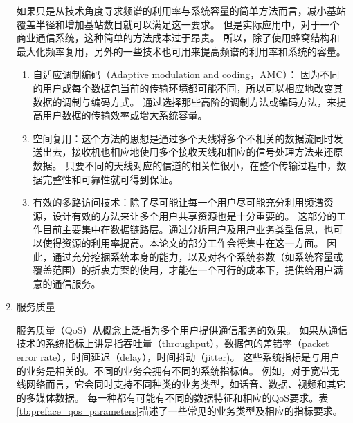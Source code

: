 \begin{enumerate}[1)]
如果只是从技术角度寻求频谱的利用率与系统容量的简单方法而言，减小基站覆盖半径和增加基站数目就可以满足这一要求。
但是实际应用中，对于一个商业通信系统，这种简单的方法成本过于昂贵。
所以，除了使用蜂窝结构和最大化频率复用，另外的一些技术也可用来提高频谱的利用率和系统的容量。
\begin{enumerate}[(1)]
\item 自适应调制编码（Adaptive modulation and coding，AMC）：
因为不同的用户或每个数据包当前的传输环境都可能不同，所以可以相应地改变其数据的调制与编码方式。
通过选择那些高阶的调制方法或编码方法，来提高用户数据的传输效率或增大系统容量。
\item 空间复用：这个方法的思想是通过多个天线将多个不相关的数据流同时发送出去，接收机也相应地使用多个接收天线和相应的信号处理方法来还原数据。
只要不同的天线对应的信道的相关性很小，在整个传输过程中，数据完整性和可靠性就可得到保证。
\item 有效的多路访问技术：除了尽可能让每一个用户尽可能充分利用频谱资源，设计有效的方法来让多个用户共享资源也是十分重要的。
这部分的工作目前主要集中在数据链路层。通过分析用户及用户业务类型信息，也可以使得资源的利用率提高。本论文的部分工作会将集中在这一方面。
因此，通过充分挖掘系统本身的能力，以及对各个系统参数（如系统容量或覆盖范围）的折衷方案的使用，才能在一个可行的成本下，提供给用户满意的通信服务。
\end{enumerate}
\item{服务质量}

服务质量（QoS）从概念上泛指为多个用户提供通信服务的效果。
如果从通信技术的系统指标上讲是指吞吐量（throughput），数据包的差错率（packet error rate），时间延迟（delay），时间抖动（jitter)。
这些系统指标是与用户的业务是相关的。不同的业务会拥有不同的系统指标值。
例如，对于宽带无线网络而言，它会同时支持不同种类的业务类型，如话音、数据、视频和其它的多媒体数据。
每一种都有可能有不同的数据特征和相应的QoS要求。表\ref{tb:preface_qos_parameters}描述了一些常见的业务类型及相应的指标要求。


\end{enumerate}
